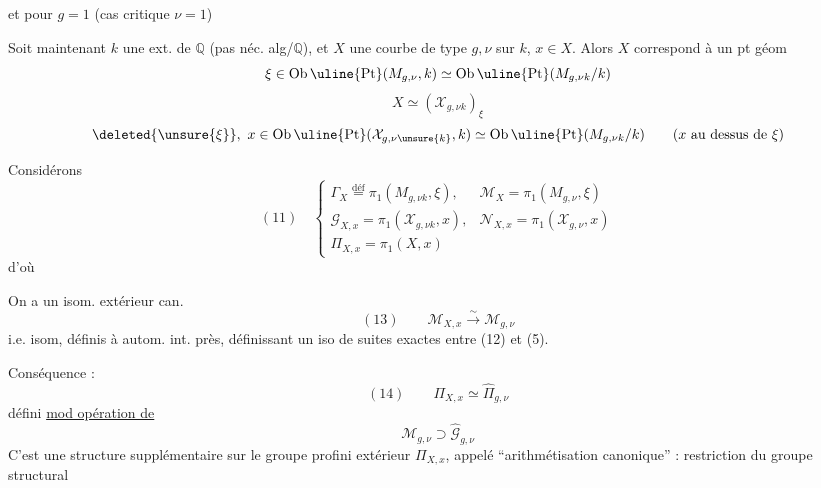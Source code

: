 et pour $g=1$ (cas critique $\nu=1$)


Soit maintenant $k$ une ext.  de $\mathbb Q$ (pas néc. alg/$\mathbb Q$), et $X$ une courbe de type $g,\nu$ sur $k$, $x\in X$. Alors $X$ correspond à un pt géom
\[
\xi\in\operatorname{Ob}\uline{\mathrm{Pt}}(M_{g,\nu},k)\simeq\operatorname{Ob}\uline{\mathrm{Pt}}(M_{g,\nu k}/k)
\]
\[
X\simeq(\mathcal X_{g,\nu k})_\xi
\]
\[
\deleted{\unsure{\xi}},\ x\in\operatorname{Ob}\uline{\mathrm{Pt}}(\mathcal X_{g,\nu\unsure{k}},k)\simeq\operatorname{Ob}\uline{\mathrm{Pt}}(M_{g,\nu k}/k)\qquad(x\text{ au dessus de }\xi)
\]

\deleted{$\unsure{\Pi}$} Considérons
\[
(11)\quad\left\{\begin{array}{ll}
\Gamma_X\overset{\mathrm{déf}}=\pi_1(M_{g,\nu k},\xi),&\mathcal M_X=\pi_1(M_{g,\nu},\xi)\\
\mathcal G_{X,x}=\pi_1(\mathcal X_{g,\nu k},x),&\mathcal N_{X,x}=\pi_1(\mathcal X_{g,\nu},x)\\
\Pi_{X,x}=\pi_1(X,x)&
\end{array}\right.
\]
d'où

 On a un isom. extérieur can.  
\[
(13)\qquad\mathcal M_{X,x}\xrightarrow{\sim}\mathcal M_{g,\nu}
\]
i.e. isom, définis à autom. int. près, définissant un iso de suites exactes entre (12) et (5).

Conséquence :
\[
(14)\qquad\Pi_{X,x}\simeq\widehat\Pi_{g,\nu}
\]
 défini \uline{mod opération de}
\[
\mathcal M_{g,\nu}\supset\widehat{\mathcal G}_{g,\nu}
\]
C'est une structure supplémentaire  sur le groupe profini extérieur $\Pi_{X,x}$, appelé  ``arithmétisation canonique'' : restriction du groupe structural

